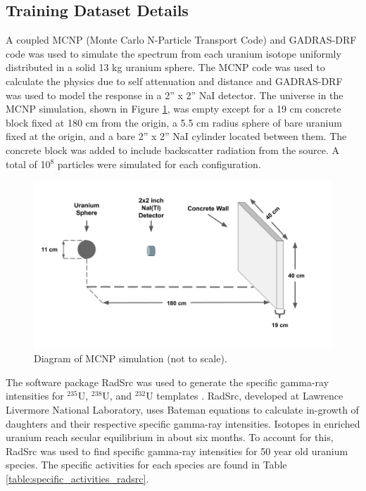 
\subsection{Training Dataset Details}

A coupled MCNP (Monte Carlo N-Particle Transport Code) and GADRAS-DRF code was used to simulate the spectrum from each uranium isotope uniformly distributed in a solid 13 kg uranium sphere. The MCNP code was used to calculate the physics due to self attenuation and distance and GADRAS-DRF was used to model the response in a 2'' x 2'' NaI detector. The universe in the MCNP simulation, shown in Figure \ref{fig:mcnp_diagram}, was empty except for a 19 cm concrete block fixed at 180 cm from the origin, a 5.5 cm radius sphere of bare uranium fixed at the origin, and a bare 2'' x 2'' NaI cylinder located between them. The concrete block was added to include backscatter radiation from the source. A total of 10$^{8}$ particles were simulated for each configuration.

\begin{figure}[H]
	\centering
    \includegraphics[trim=50 50 50 50,clip,width=0.99\linewidth]{images/mcnp_diagram.png}
	\caption{Diagram of MCNP simulation (not to scale).}
	\label{fig:mcnp_diagram}
\end{figure}

The software package RadSrc was used to generate the specific gamma-ray intensities for $^{235}$U, $^{238}$U, and $^{232}$U templates \cite{Hiller2007}. RadSrc, developed at Lawrence Livermore National Laboratory, uses Bateman equations to calculate in-growth of daughters and their respective specific gamma-ray intensities. Isotopes in enriched uranium reach secular equilibrium in about six months. To account for this, RadSrc was used to find specific gamma-ray intensities for 50 year old uranium species. The specific activities for each species are found in Table \ref{table:specific_activities_radsrc}.

